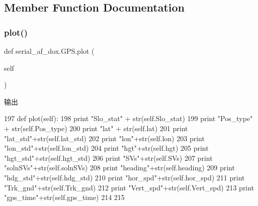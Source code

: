\subsection{Member Function Documentation}
\mbox{\label{classserial__af__dox_1_1_g_p_s_afe58fd912e3959bb37461f06207e79a3}} 
\subsubsection{\texorpdfstring{plot()}{plot()}}
{\footnotesize\ttfamily def serial\+\_\+af\+\_\+dox.\+G\+P\+S.\+plot (\begin{DoxyParamCaption}\item[{}]{self }\end{DoxyParamCaption})}



输出 


\begin{DoxyCode}
197     \textcolor{keyword}{def }plot(self):
198         \textcolor{keywordflow}{print} \textcolor{stringliteral}{"Slo\_stat"} + str(self.Slo\_stat)
199         \textcolor{keywordflow}{print} \textcolor{stringliteral}{"Pos\_type"} + str(self.Pos\_type)
200         \textcolor{keywordflow}{print} \textcolor{stringliteral}{"lat"} + str(self.lat)
201         \textcolor{keywordflow}{print} \textcolor{stringliteral}{"lat\_std"}+str(self.lat\_std)
202         \textcolor{keywordflow}{print} \textcolor{stringliteral}{"lon"}+str(self.lon)
203         \textcolor{keywordflow}{print} \textcolor{stringliteral}{"lon\_std"}+str(self.lon\_std)
204         \textcolor{keywordflow}{print} \textcolor{stringliteral}{"hgt"}+str(self.hgt)
205         \textcolor{keywordflow}{print} \textcolor{stringliteral}{"hgt\_std"}+str(self.hgt\_std)
206         \textcolor{keywordflow}{print} \textcolor{stringliteral}{"SVs"}+str(self.SVs)
207         \textcolor{keywordflow}{print} \textcolor{stringliteral}{"solnSVs"}+str(self.solnSVs)
208         \textcolor{keywordflow}{print} \textcolor{stringliteral}{"heading"}+str(self.heading)
209         \textcolor{keywordflow}{print} \textcolor{stringliteral}{"hdg\_std"}+str(self.hdg\_std)
210         \textcolor{keywordflow}{print} \textcolor{stringliteral}{"hor\_spd"}+str(self.hor\_spd)
211         \textcolor{keywordflow}{print} \textcolor{stringliteral}{"Trk\_gnd"}+str(self.Trk\_gnd)
212         \textcolor{keywordflow}{print} \textcolor{stringliteral}{"Vert\_spd"}+str(self.Vert\_spd)
213         \textcolor{keywordflow}{print} \textcolor{stringliteral}{"gps\_time"}+str(self.gps\_time)
214 
215 
\end{DoxyCode}


